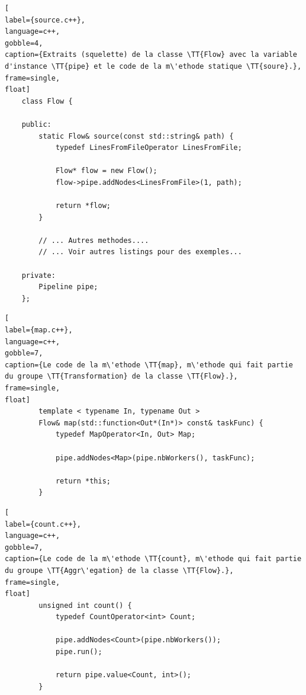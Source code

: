 \begin{lstlisting}[
label={source.c++},
language=c++,
gobble=4,
caption={Extraits (squelette) de la classe \TT{Flow} avec la variable d'instance \TT{pipe} et le code de la m\'ethode statique \TT{soure}.},
frame=single,
float]
    class Flow {

    public:
        static Flow& source(const std::string& path) {
            typedef LinesFromFileOperator LinesFromFile;

            Flow* flow = new Flow();
            flow->pipe.addNodes<LinesFromFile>(1, path);

            return *flow;
        }

        // ... Autres methodes....
        // ... Voir autres listings pour des exemples...

    private:
        Pipeline pipe;
    };
\end{lstlisting}


\begin{lstlisting}[
label={map.c++},
language=c++,
gobble=7,
caption={Le code de la m\'ethode \TT{map}, m\'ethode qui fait partie du groupe \TT{Transformation} de la classe \TT{Flow}.},
frame=single,
float]
        template < typename In, typename Out >
        Flow& map(std::function<Out*(In*)> const& taskFunc) {
            typedef MapOperator<In, Out> Map;
            
            pipe.addNodes<Map>(pipe.nbWorkers(), taskFunc);

            return *this;
        }
\end{lstlisting}


\begin{lstlisting}[
label={count.c++},
language=c++,
gobble=7,
caption={Le code de la m\'ethode \TT{count}, m\'ethode qui fait partie du groupe \TT{Aggr\'egation} de la classe \TT{Flow}.},
frame=single,
float]
        unsigned int count() {
            typedef CountOperator<int> Count;
            
            pipe.addNodes<Count>(pipe.nbWorkers());
            pipe.run();

            return pipe.value<Count, int>();
        }
\end{lstlisting}



